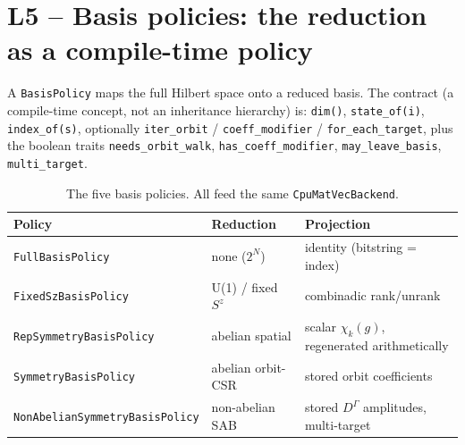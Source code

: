 \documentclass[11pt]{article}
\newcommand{\code}[1]{\texttt{\small #1}}
\begin{document}
\section{L5 -- Basis policies: the reduction as a compile-time policy}

A \code{BasisPolicy} maps the full Hilbert space onto a reduced basis.
The contract (a compile-time concept, not an inheritance hierarchy) is:
\code{dim()}, \code{state\_of(i)}, \code{index\_of(s)}, optionally
\code{iter\_orbit} / \code{coeff\_modifier} / \code{for\_each\_target},
plus the boolean traits \code{needs\_orbit\_walk},
\code{has\_coeff\_modifier}, \code{may\_leave\_basis}, \code{multi\_target}.

\begin{table}[h]
\centering\small
\begin{tabular}{@{}lll@{}}
\toprule
Policy & Reduction & Projection \\
\midrule
\code{FullBasisPolicy}        & none ($2^N$)          & identity (bitstring = index) \\
\code{FixedSzBasisPolicy}     & U(1) / fixed $S^z$    & combinadic rank/unrank \\
\code{RepSymmetryBasisPolicy} & abelian spatial       & scalar $\chi_k(g)$, regenerated arithmetically \\
\code{SymmetryBasisPolicy}    & abelian orbit-CSR     & stored orbit coefficients \\
\code{NonAbelianSymmetryBasisPolicy} & non-abelian SAB & stored $D^\Gamma$ amplitudes, multi-target \\
\bottomrule
\end{tabular}
\caption{The five basis policies. All feed the same \code{CpuMatVecBackend}.}
\end{table}
\end{document}
